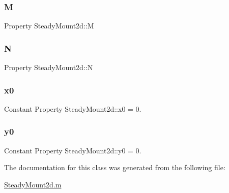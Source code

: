 \subsubsection{\texorpdfstring{M}{M}}
{\footnotesize\ttfamily Property Steady\+Mount2d\+::M}

\mbox{\label{class_steady_mount2d_ac3443a8e75ae838f0212f2d648c168c4}} 
\subsubsection{\texorpdfstring{N}{N}}
{\footnotesize\ttfamily Property Steady\+Mount2d\+::N}

\mbox{\label{class_steady_mount2d_aa4a366c7ec5981f5588efbbd4669b56e}} 
\subsubsection{\texorpdfstring{x0}{x0}}
{\footnotesize\ttfamily Constant Property Steady\+Mount2d\+::x0 = 0.}

\mbox{\label{class_steady_mount2d_afeec43a762fb06dee2b0d30f9da5d286}} 
\subsubsection{\texorpdfstring{y0}{y0}}
{\footnotesize\ttfamily Constant Property Steady\+Mount2d\+::y0 = 0.}



The documentation for this class was generated from the following file\+:\begin{DoxyCompactItemize}
\item 
\hyperlink{_steady_mount2d_8m}{Steady\+Mount2d.\+m}\end{DoxyCompactItemize}
